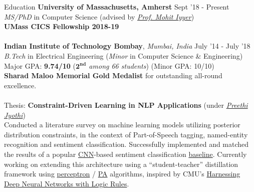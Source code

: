 \documentclass{resume} %
\begin{document}
\vspace*{-1mm}
\begin{rSection}{Education}
{\bf University of Massachusetts, Amherst} \hfill {Sept '18 - Present} \\ \textit{MS/PhD} in Computer Science (advised by \textit{\href{https://people.cs.umass.edu/~miyyer/}{Prof. Mohit Iyyer}}) \\
\textbf{UMass CICS Fellowship 2018-19}\\\\
{\bf Indian Institute of Technology Bombay}, \textit{Mumbai, India} \hfill {July '14 - July '18} \\ 
\textit{B.Tech} in Electrical Engineering (\textit{Minor} in Computer Science \& Engineering)\\
Major GPA: \textbf{9.74/10} (\textit{$\mathbf{2^{nd}}$ among 66 students}) (Minor GPA: 10/10)\\
\textbf{Sharad Maloo Memorial Gold Medalist} for outstanding all-round excellence. \\\\
Thesis: \textbf{Constraint-Driven Learning in NLP Applications} (under \textit{\href{https://www.cse.iitb.ac.in/~pjyothi/}{Preethi Jyothi}}) \\
Conducted a literature survey on machine learning models utilizing posterior distribution constraints, in the context of Part-of-Speech tagging, named-entity recognition and sentiment classification. Successfully implemented and matched the results of a popular \href{https://en.wikipedia.org/wiki/Convolutional_neural_network}{CNN}-based sentiment classification \href{https://arxiv.org/abs/1408.5882}{baseline}. Currently working on extending this architecture using a ``student-teacher'' distillation framework using \href{http://www.cs.columbia.edu/~mcollins/papers/tagperc.pdf}{perceptron} / \href{http://jmlr.csail.mit.edu/papers/volume7/crammer06a/crammer06a.pdf}{PA} algorithms, inspired by CMU's \href{https://arxiv.org/pdf/1603.06318.pdf}{Harnessing Deep Neural Networks with Logic Rules}.
\end{rSection}
\end{document}
